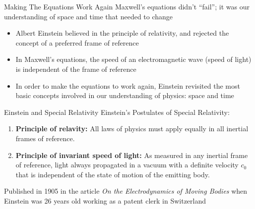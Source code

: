 \documentclass[12pt,aspectratio=169]{beamer}
\begin{document}
\begin{frame}{Making The Equations Work Again}
  Maxwell's equations didn't ``fail''; it was our understanding of space and
  time that needed to change
  \begin{itemize}
  \item Albert Einstein believed in the principle of relativity, and rejected
    the concept of a preferred frame of reference
  \item In Maxwell's equations, the speed of an electromagnetic wave (speed of
    light) is independent of the frame of reference
  \item In order to make the equations to work again, Einstein revisited the
    most basic concepts involved in our understanding of physics: space and
    time
  \end{itemize}
\end{frame}



\begin{frame}{Einstein and Special Relativity}
  Einstein's Postulates of Special Relativity:
  \begin{enumerate}
  \item\textbf{Principle of relavity:} All laws of physics must apply equally
    in all inertial frames of reference.
  \item\textbf{Principle of invariant speed of light:} As measured in any
    inertial frame of reference, light always propagated in a vacuum with a
    definite velocity $c_0$ that is independent of the state of motion of the
    emitting body.
  \end{enumerate}
  Published in 1905 in the article \emph{On the Electrodynamics of Moving
    Bodies} when Einstein was 26 years old working as a patent clerk in
  Switzerland
\end{frame}
\end{document}

